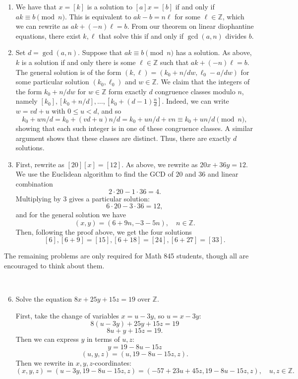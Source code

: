 \documentclass{amsart}
\def\Z{\mathbb Z}
\begin{document}
\begin{enumerate}
\begin{framed}
\begin{enumerate}
\item We have that $x=[k]$ is a solution to $[a] x = [b]$ if and only if $ak \equiv b \pmod{n}$. This is equivalent to $ak - b = n \ell$ for some $\ell\in \Z$, which we can rewrite as $ak + (-n)\ell = b$. From our theorem on linear diophantine equations, there exist $k,\ell$ that solve this if and only if $\gcd(a,n)$ divides $b$.
\item Set $d=\gcd(a,n)$. Suppose that $ak \equiv b \pmod{n}$ has a solution. As above, $k$ is a solution if and only there is some $\ell\in \Z$ such that $ak + (-n)\ell = b$. The general solution is of the form $(k,\ell) = (k_0 + n/d w, \ell_0 - a/d w)$ for some particular solution $(k_0,\ell_0)$ and $w\in \Z$. We claim that the integers of the form $k_0 + n/d w$ for $w\in \Z$ form exactly $d$ congruence classes modulo $n$, namely $[k_0], [k_0 + n/d] ,\dots, [k_0 + (d-1)\frac{n}{d}]$. Indeed, we can write $w = v d + u$ with $0\leq u < d$, and so 
\[ k_0+ w n/d = k_0 + (v d + u) n/d = k_0 + u n/d + vn \equiv k_0 + u n/d \pmod{n},\]
showing that each such integer is in one of these congruence classes. A similar argument shows that these classes are distinct. Thus, there are exactly $d$ solutions.
\item First, rewrite as $[20][x] = [12]$. As above, we rewrite as $20 x +36 y = 12$. 
We use the Euclidean algorithm to find the GCD of $20$ and $36$ and linear combination
\[ 2 \cdot 20 - 1 \cdot 36 = 4.\]
Multiplying by $3$ gives a particular solution:
\[ 6 \cdot 20 - 3 \cdot 36 = 12,\]
and for the general solution we have
\[ (x,y) = (6 + 9n, -3 - 5n) , \quad n\in \Z.\]
Then, following the proof above, we get the four solutions
\[ [6], [6+9]=[15], [6+18]=[24], [6+27] = [33].\]
\end{enumerate}
\end{framed}


\end{enumerate}

\noindent  \hrulefill

\noindent The remaining problems are only required for Math 845 students, though all are encouraged to think about them.

\

\begin{enumerate}\setcounter{enumi}{5}



\item Solve the equation $8x + 25y + 15z = 19$ over $\Z$.

\begin{framed} First, take the change of variables $x=u-3y$, so $u=x-3y$:
\[ 8(u-3y) +  25y +15 z = 19\]
\[ 8u + y +15 z = 19.\]
Then we can express $y$ in terms of $u,z$:
\[ y= 19-8u -15 z\]
\[ (u,y,z) = (u, 19-8u -15 z, z).\]
Then we rewrite in $x,y,z$-coordinates:
\[ (x,y,z) = (u-3y, 19-8u -15 z, z) = (-57 + 23 u +45 z , 19-8u -15 z, z), \quad u,z\in \Z.\]
\end{framed}

\end{enumerate}
\end{document}

